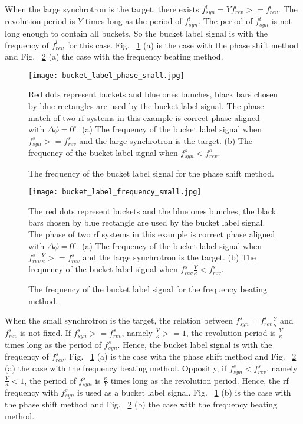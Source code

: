 When the large synchrotron is the target, there exists $f_{\mathit{syn}}^{l}=Yf_{\mathit{rev}}^{l}>=f_{\mathit{rev}}^{l}$. The revolution period is $Y$ times long as the period of $f_{\mathit{syn}}^{l}$. The period of $f_{\mathit{syn}}^{l}$ is not long enough to contain all buckets. So the bucket label signal is with the frequency of $f_{\mathit{rev}}^{l}$ for this case. Fig. ~\ref{bucket_label_phase_small} (a) is the case with the phase shift method and Fig. ~\ref{bucket_label_frequency_small} (a) the case with the frequency beating method. 
\begin{figure}[!htb]
   \centering   
   \texttt{[image: bucket\_label\_phase\_small.jpg]}
   \caption{The frequency of the bucket label signal for the phase shift method.}{Red dots represent buckets and blue ones bunches, black bars chosen by blue rectangles are used by the bucket label signal. The phase match of two rf systems in this example is correct phase aligned with $\Delta\phi=0^\circ$. (a) The frequency of the bucket label signal when $f_{\mathit{syn}}^{s}>=f_{\mathit{rev}}^{s}$ and the large synchrotron is the target. (b) The frequency of the bucket label signal when $f_{\mathit{syn}}^{s}<f_{\mathit{rev}}^{s}$.}
   \label{bucket_label_phase_small}
\end{figure}
\begin{figure}[!htb]
   \centering   
   \texttt{[image: bucket\_label\_frequency\_small.jpg]}
   \caption{The frequency of the bucket label signal for the frequency beating method.}{The red dots represent buckets and the blue ones bunches, the black bars chosen by blue rectangle are used by the bucket label signal. The phase of two rf systems in this example is correct phase aligned with $\Delta\phi=0^\circ$. (a) The frequency of the bucket label signal when $f_{\mathit{rev}}^{s}\frac{Y}{\kappa}>=f_{\mathit{rev}}^{s}$ and the large synchrotron is the target. (b) The frequency of the bucket label signal when $f_{\mathit{rev}}^{s}\frac{Y}{\kappa}<f_{\mathit{rev}}^{s}$.}
   \label{bucket_label_frequency_small}
\end{figure}

When the small synchrotron is the target, the relation between $f_{\mathit{syn}}^{s}=f_{\mathit{rev}}^{s}\frac{Y}{\kappa}$ and $f_{\mathit{rev}}^{s}$ is not fixed. If $f_{\mathit{syn}}^{s}>=f_{\mathit{rev}}^{s}$, namely $\frac{Y}{\kappa}>=1$, the revolution period is $\frac{Y}{\kappa}$ times long as the period of $f_{\mathit{syn}}^{s}$. Hence, the bucket label signal is with the frequency of $f_{\mathit{rev}}^{s}$. Fig. ~\ref{bucket_label_phase_small} (a) is the case with the phase shift method and Fig. ~\ref{bucket_label_frequency_small} (a) the case with the frequency beating method. Oppositly,  if $f_{\mathit{syn}}^{s}<f_{\mathit{rev}}^{s}$, namely $\frac{Y}{\kappa}<1$, the period of $f_{\mathit{syn}}^{s}$ is $\frac{\kappa}{Y}$ times long as the revolution period. Hence, the rf frequency with $f_{\mathit{syn}}^{s}$ is used as a bucket label signal. Fig. ~\ref{bucket_label_phase_small} (b) is the case with the phase shift method and Fig. ~\ref{bucket_label_frequency_small} (b) the case with the frequency beating method. 




